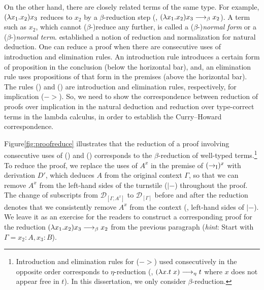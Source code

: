 On the other hand, there are closely related terms of the same type.
For example, $(\lambda x_1.x_2) x_3$ reduces to $x_2$ by a $\beta$-reduction step
(\ie, $(\lambda x_1.x_2) x_3 -->_\beta x_2$). A term such as $x_2$, which cannot
($\beta$-)reduce any further, is called a ($\beta$-)\emph{normal form} or
a ($\beta$-)\emph{normal term}. \citet{Pra65} established a notion of
reduction and normalization for natural deduction. One can reduce a proof
when there are consecutive uses of introduction and elimination rules.
An introduction rule introduces a certain form of proposition
in the conclusion (below the horizontal bar), and, an elimination rule
uses propositions of that form in the premises (above the horizontal bar).
The rules () and ()
are introduction and elimination rules, respectively, for implication ($->$).
So, we need to show the correspondence between reduction of proofs
over implication in the natural deduction and reduction over
type-correct terms in the lambda calculus,
in order to establish the Curry--Howard correspondence.

Figure\;\ref{fig:proofreduce} illustrates that
the reduction of a proof involving consecutive uses of
() and ()
corresponds to the $\beta$-reduction of well-typed terms.\footnote{
        Introduction and elimination rules for ($->$) used consecutively
        in the opposite order corresponds to $\eta$-reduction
        (\ie, $(\lambda x. t\;x) -->_\eta t$ where $x$ does not appear free in $t$).
        In this dissertation, we only consider $\beta$-reduction.}
To reduce the proof, we replace the uses of $A^x$ in the premise of
$(->_\textsc{I})^x$ with derivation $D'$, which deduces $A$ from
the original context $\Gamma$, so that we can remove $A^x$ from
the left-hand sides of the turnstile ($|-$) throughout the proof.
The change of subscripts from $\mathcal{D}_{[\Gamma,A^x]}$ to
$\mathcal{D}_{[\Gamma]}$ before and after the reduction
denotes that we consistently remove $A^x$ from the context
(\ie, left-hand sides of $|-$). We leave it as an exercise for
the readers to construct a corresponding proof for the reduction
$(\lambda x_1.x_2) x_3 -->_\beta x_2$ from the previous paragraph
(\textit{hint}: Start with $\Gamma = x_2:A,x_3:B$).

